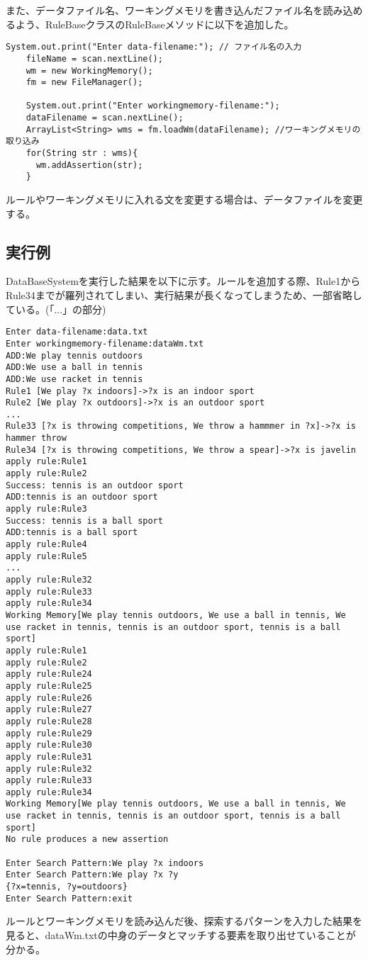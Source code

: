 \documentclass[a4j]{jarticle}
\begin{document}
また、データファイル名、ワーキングメモリを書き込んだファイル名を読み込めるよう、RuleBaseクラスのRuleBaseメソッドに以下を追加した。
\begin{lstlisting}[caption=RuleBaseメソッド]
    System.out.print("Enter data-filename:"); // ファイル名の入力
    fileName = scan.nextLine();
    wm = new WorkingMemory();
    fm = new FileManager();

    System.out.print("Enter workingmemory-filename:");
    dataFilename = scan.nextLine();
    ArrayList<String> wms = fm.loadWm(dataFilename); //ワーキングメモリの取り込み
    for(String str : wms){
      wm.addAssertion(str);
    }
\end{lstlisting}
ルールやワーキングメモリに入れる文を変更する場合は、データファイルを変更する。

\subsection{実行例}
DataBaseSystemを実行した結果を以下に示す。ルールを追加する際、Rule1からRule34までが羅列されてしまい、実行結果が長くなってしまうため、一部省略している。(「...」の部分)
\begin{lstlisting}
Enter data-filename:data.txt
Enter workingmemory-filename:dataWm.txt
ADD:We play tennis outdoors
ADD:We use a ball in tennis
ADD:We use racket in tennis
Rule1 [We play ?x indoors]->?x is an indoor sport
Rule2 [We play ?x outdoors]->?x is an outdoor sport
...
Rule33 [?x is throwing competitions, We throw a hammmer in ?x]->?x is hammer throw
Rule34 [?x is throwing competitions, We throw a spear]->?x is javelin
apply rule:Rule1
apply rule:Rule2
Success: tennis is an outdoor sport
ADD:tennis is an outdoor sport
apply rule:Rule3
Success: tennis is a ball sport
ADD:tennis is a ball sport
apply rule:Rule4
apply rule:Rule5
...
apply rule:Rule32
apply rule:Rule33
apply rule:Rule34
Working Memory[We play tennis outdoors, We use a ball in tennis, We use racket in tennis, tennis is an outdoor sport, tennis is a ball sport]
apply rule:Rule1
apply rule:Rule2
apply rule:Rule24
apply rule:Rule25
apply rule:Rule26
apply rule:Rule27
apply rule:Rule28
apply rule:Rule29
apply rule:Rule30
apply rule:Rule31
apply rule:Rule32
apply rule:Rule33
apply rule:Rule34
Working Memory[We play tennis outdoors, We use a ball in tennis, We use racket in tennis, tennis is an outdoor sport, tennis is a ball sport]
No rule produces a new assertion

Enter Search Pattern:We play ?x indoors
Enter Search Pattern:We play ?x ?y
{?x=tennis, ?y=outdoors}
Enter Search Pattern:exit
\end{lstlisting}
ルールとワーキングメモリを読み込んだ後、探索するパターンを入力した結果を見ると、dataWm.txtの中身のデータとマッチする要素を取り出せていることが分かる。
\end{document}
